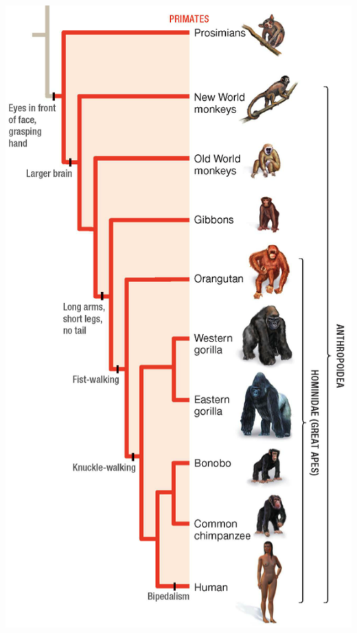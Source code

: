 \begin{frame}[t]
\begin{adjustwidth}{-2em}{-1.5em}
\begin{columns}[t]
            \vspace{-1mm}
            \begin{center}
                \includegraphics[height=\textheight]{primate-tree.png}
            \end{center}

        \end{columns}
    \end{adjustwidth}
\end{frame}



